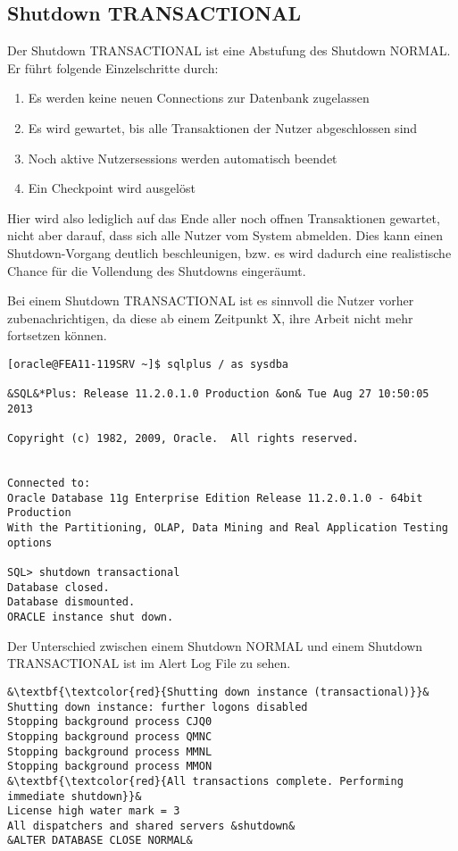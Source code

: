       \subsection{Shutdown TRANSACTIONAL}
        Der Shutdown TRANSACTIONAL ist eine Abstufung des Shutdown NORMAL. Er f\"uhrt folgende Einzelschritte durch:
        \begin{enumerate}
          \item Es werden keine neuen Connections zur Datenbank zugelassen
          \item Es wird gewartet, bis alle Transaktionen der Nutzer abgeschlossen sind
          \item Noch aktive Nutzersessions werden automatisch beendet
          \item Ein Checkpoint wird ausgel\"ost
        \end{enumerate}
        Hier wird also lediglich auf das Ende aller noch offnen Transaktionen gewartet, nicht aber darauf, dass sich alle Nutzer vom System abmelden. Dies kann einen Shutdown-Vorgang deutlich beschleunigen, bzw. es wird dadurch eine realistische Chance f\"ur die Vollendung des Shutdowns einger\"aumt.
        \begin{merke}
          Bei einem Shutdown TRANSACTIONAL ist es sinnvoll die Nutzer vorher zubenachrichtigen, da diese ab einem Zeitpunkt X, ihre Arbeit nicht mehr fortsetzen k\"onnen.
        \end{merke}
        \begin{lstlisting}[caption={Durchf\"uhren eines Shutdown
        TRANSACTIONAL},label=admin09,language=sqlplus]
[oracle@FEA11-119SRV ~]$ sqlplus / as sysdba

&SQL&*Plus: Release 11.2.0.1.0 Production &on& Tue Aug 27 10:50:05 2013

Copyright (c) 1982, 2009, Oracle.  All rights reserved.


Connected to:
Oracle Database 11g Enterprise Edition Release 11.2.0.1.0 - 64bit Production
With the Partitioning, OLAP, Data Mining and Real Application Testing options

SQL> shutdown transactional
Database closed.
Database dismounted.
ORACLE instance shut down.
        \end{lstlisting}
        Der Unterschied zwischen einem Shutdown NORMAL und einem Shutdown TRANSACTIONAL ist im Alert Log File zu sehen.
        \begin{lstlisting}[caption={Der Shutdown TRANSACTIONAL im Alert
        Log},label=admin10,language=terminal]
&\textbf{\textcolor{red}{Shutting down instance (transactional)}}&
Shutting down instance: further logons disabled
Stopping background process CJQ0
Stopping background process QMNC
Stopping background process MMNL
Stopping background process MMON
&\textbf{\textcolor{red}{All transactions complete. Performing immediate shutdown}}&
License high water mark = 3
All dispatchers and shared servers &shutdown&
&ALTER DATABASE CLOSE NORMAL&
        \end{lstlisting}
